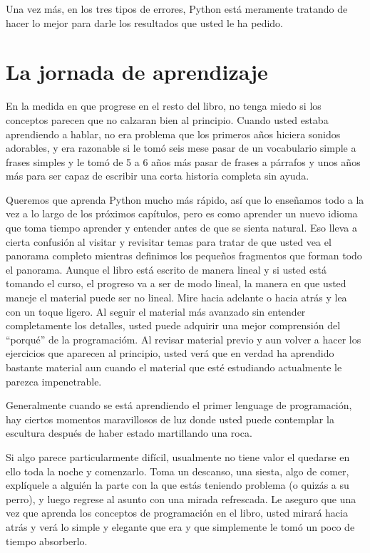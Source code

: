 Una vez m\'as, en los tres tipos de errores, Python est\'a meramente tratando de hacer lo mejor para darle los resultados que usted le ha pedido.

\section{La jornada de aprendizaje}

En la medida en que progrese en el resto del libro, no tenga miedo si los conceptos 
parecen que no calzaran bien al principio. Cuando usted estaba aprendiendo a hablar, no era problema que los primeros a\~nos hiciera sonidos adorables, y era razonable si le tom\'o seis mese pasar de un vocabulario simple a frases simples y le tom\'o de 5 a 6 a\~nos m\'as pasar de frases a p\'arrafos y unos a\~nos m\'as para ser capaz de escribir una corta historia completa  sin ayuda.

Queremos que aprenda Python mucho m\'as r\'apido, as\'i que lo ense\~namos todo a la vez a lo largo de los pr\'oximos cap\'itulos, pero es como aprender un nuevo idioma que toma tiempo aprender y entender antes de que se sienta natural.
Eso lleva a cierta confusi\'on al visitar y revisitar temas para tratar de que usted vea el panorama completo mientras definimos los peque\~nos fragmentos que forman todo el panorama. Aunque el libro est\'a escrito de manera lineal y si usted est\'a tomando el curso, el progreso va a ser de modo lineal, la manera en que usted maneje el material puede ser no lineal. Mire hacia adelante o hacia atr\'as y lea con un toque ligero. Al seguir el material m\'as avanzado sin entender completamente los detalles, usted puede adquirir una mejor comprensi\'on del ``porqu\'e'' 
de la programaci\'om. Al revisar material previo y aun volver a hacer los ejercicios que aparecen al principio, usted ver\'a que en verdad ha aprendido bastante material aun cuando el material que est\'e estudiando actualmente le parezca impenetrable.

Generalmente cuando se est\'a aprendiendo el primer lenguage de programaci\'on, hay ciertos momentos maravillosos de luz donde usted puede contemplar la escultura despu\'es de haber estado martillando una roca.

Si algo parece particularmente difícil, usualmente no tiene valor el quedarse en ello toda la noche y comenzarlo. Toma un descanso, una siesta, algo de comer, expl\'iquele a algui\'en la parte con la que est\'as teniendo problema (o quiz\'as a su perro), y luego regrese al asunto con una mirada refrescada. Le aseguro que una vez que aprenda los conceptos de programaci\'on en el libro, usted mirar\'a hacia atr\'as y ver\'a lo simple y elegante que era y que simplemente le tom\'o un poco de tiempo absorberlo.

